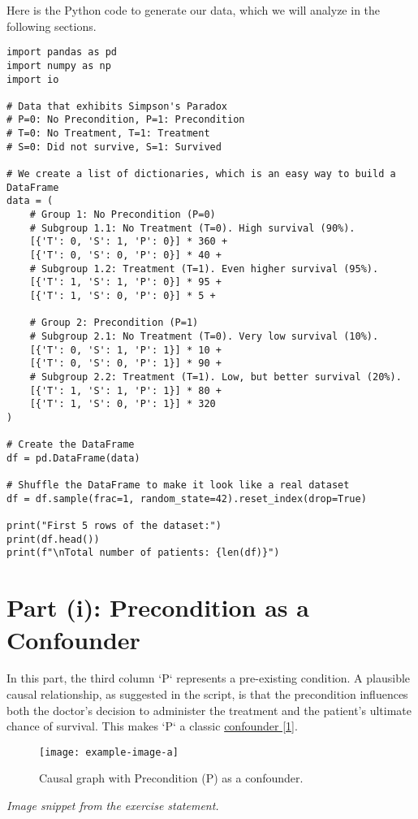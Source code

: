 \documentclass[11pt,a4paper]{article}
\begin{document}
Here is the Python code to generate our data, which we will analyze in the following sections.
\begin{lstlisting}[caption={Python code to generate a DataFrame exhibiting Simpson's Paradox.}, label={lst:data_gen}]
import pandas as pd
import numpy as np
import io

# Data that exhibits Simpson's Paradox
# P=0: No Precondition, P=1: Precondition
# T=0: No Treatment, T=1: Treatment
# S=0: Did not survive, S=1: Survived

# We create a list of dictionaries, which is an easy way to build a DataFrame
data = (
    # Group 1: No Precondition (P=0)
    # Subgroup 1.1: No Treatment (T=0). High survival (90%).
    [{'T': 0, 'S': 1, 'P': 0}] * 360 +
    [{'T': 0, 'S': 0, 'P': 0}] * 40 +
    # Subgroup 1.2: Treatment (T=1). Even higher survival (95%).
    [{'T': 1, 'S': 1, 'P': 0}] * 95 +
    [{'T': 1, 'S': 0, 'P': 0}] * 5 +

    # Group 2: Precondition (P=1)
    # Subgroup 2.1: No Treatment (T=0). Very low survival (10%).
    [{'T': 0, 'S': 1, 'P': 1}] * 10 +
    [{'T': 0, 'S': 0, 'P': 1}] * 90 +
    # Subgroup 2.2: Treatment (T=1). Low, but better survival (20%).
    [{'T': 1, 'S': 1, 'P': 1}] * 80 +
    [{'T': 1, 'S': 0, 'P': 1}] * 320
)

# Create the DataFrame
df = pd.DataFrame(data)

# Shuffle the DataFrame to make it look like a real dataset
df = df.sample(frac=1, random_state=42).reset_index(drop=True)

print("First 5 rows of the dataset:")
print(df.head())
print(f"\nTotal number of patients: {len(df)}")
\end{lstlisting}

\section{Part (i): Precondition as a Confounder}

In this part, the third column `P` represents a pre-existing condition. A plausible causal relationship, as suggested in the script, is that the precondition influences both the doctor's decision to administer the treatment and the patient's ultimate chance of survival. This makes `P` a classic \hyperref[sec:confounding]{confounder [1]}.

\begin{figure}[H]
    \centering
    \texttt{[image: example-image-a]}
    \caption{Causal graph with Precondition (P) as a confounder.}
    \label{fig:confounder_graph}
\end{figure}
\textit{Image snippet from the exercise statement.}
\end{document}
